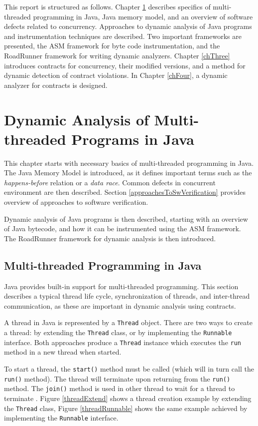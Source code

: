 This report is structured as follows. Chapter \ref{chTwo} describes specifics of
multi-threaded programming in Java, Java memory model, and an overview of
software defects related to concurrency. Approaches to dynamic analysis of Java
programs and instrumentation techniques are described. Two important frameworks
are presented, the ASM framework for byte code instrumentation, and the
RoadRunner framework for writing dynamic analyzers. Chapter \ref{chThree}
introduces contracts for concurrency, their modified versions, and a method for
dynamic detection of contract violations. In Chapter \ref{chFour}, a dynamic
analyzer for contracts is designed.



\chapter{Dynamic Analysis of Multi-threaded Programs in Java}
\label{chTwo}

This chapter starts with necessary basics of multi-threaded programming in Java.
The Java Memory Model is introduced, as it defines important terms such as the
\emph{happens-before} relation or a \emph{data race}. Common defects in
concurrent environment are then described. Section
\ref{approachesToSwVerification} provides overview of approaches to software
verification.

Dynamic analysis of Java programs is then described, starting with an overview
of Java bytecode, and how it can be instrumented using the ASM framework. The
RoadRunner framework for dynamic analysis is then introduced.


\section{Multi-threaded Programming in Java}

Java provides built-in support for multi-threaded programming. This section
describes a typical thread life cycle, synchronization of threads, and
inter-thread communication, as these are important in dynamic analysis using
contracts.

A thread in Java is represented by a \texttt{Thread} object. There are two ways
to create a thread: by extending the \texttt{Thread} class, or by implementing
the \texttt{Runnable} interface. Both approaches produce a \texttt{Thread}
instance which executes the \texttt{run} method in a new thread when started.

To start a thread, the \texttt{start()} method must be called (which will in
turn call the \texttt{run()} method). The thread will terminate upon returning
from the \texttt{run()} method. The \texttt{join()} method is used in other
thread to wait for a thread to terminate \cite{javaTheCompleteReference}.
Figure \ref{threadExtend} shows a thread creation example by extending the
\texttt{Thread} class, Figure \ref{threadRunnable} shows the same example
achieved by implementing the \texttt{Runnable} interface.

